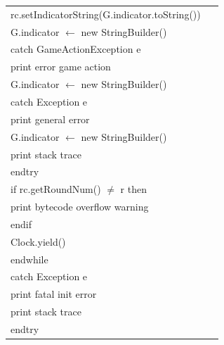 \documentclass{article}
\newenvironment{pseudobox}
{
\centering
\begin{longtable}{|p{0.94\linewidth}|}
\hline
}
{
\\ \hline
\end{longtable}
\vspace{0.05cm}
}
\begin{document}
\begin{pseudobox}
\hspace*{4em} rc.setIndicatorString(G.indicator.toString()) \\
\hspace*{4em} G.indicator $\leftarrow$ new StringBuilder() \\
\hspace*{3em} catch GameActionException e \\
\hspace*{4em} print error game action \\
\hspace*{4em} G.indicator $\leftarrow$ new StringBuilder() \\
\hspace*{3em} catch Exception e \\
\hspace*{4em} print general error \\
\hspace*{4em} G.indicator $\leftarrow$ new StringBuilder() \\
\hspace*{4em} print stack trace \\
\hspace*{3em} endtry \\

\hspace*{3em} if rc.getRoundNum() $\neq$ r then \\
\hspace*{4em} print bytecode overflow warning \\
\hspace*{3em} endif \\

\hspace*{3em} Clock.yield() \\
\hspace*{2em} endwhile \\
\hspace*{1em} catch Exception e \\
\hspace*{2em} print fatal init error \\
\hspace*{2em} print stack trace \\
\hspace*{1em} endtry
\end{pseudobox}
\end{document}
